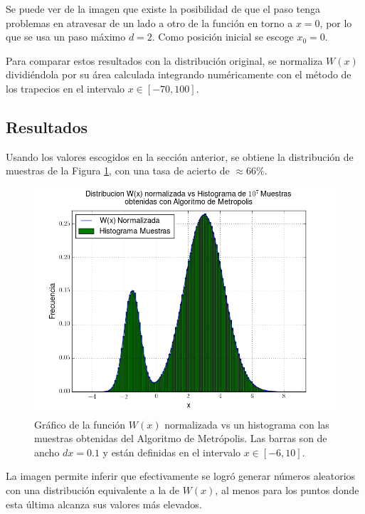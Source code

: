 \documentclass{article}
\begin{document}
Se puede ver de la imagen que existe la posibilidad de que el paso tenga problemas en atravesar de un lado a otro de la función en torno a $ x = 0 $, por lo que se usa un paso máximo $d = 2$. Como posición inicial se escoge $x_0 = 0$.

Para comparar estos resultados con la distribución original, se normaliza $W(x)$ dividiéndola por su área calculada integrando numéricamente con el método de los trapecios en el intervalo $x \in [-70, 100]$.

\clearpage
\subsection{Resultados}

Usando los valores escogidos en la sección anterior, se obtiene la distribución de muestras de la Figura \ref{fig:resultados}, con una tasa de acierto de $\approx 66\%$.

\begin{figure}[ht]
  \centering
  \includegraphics[scale = 0.65]{images/resultado_P2.png}
  \caption{Gráfico de la función $W(x)$ normalizada vs un histograma con las muestras obtenidas del Algoritmo de Metrópolis. Las barras son de ancho $dx = 0.1$ y están definidas en el intervalo $x \in [-6, 10]$.}
  \label{fig:resultados}
\end{figure}

La imagen permite inferir que efectivamente se logró generar números aleatorios con una distribución equivalente a la de $W(x)$, al menos para los puntos donde esta última alcanza sus valores más elevados.
\end{document}
